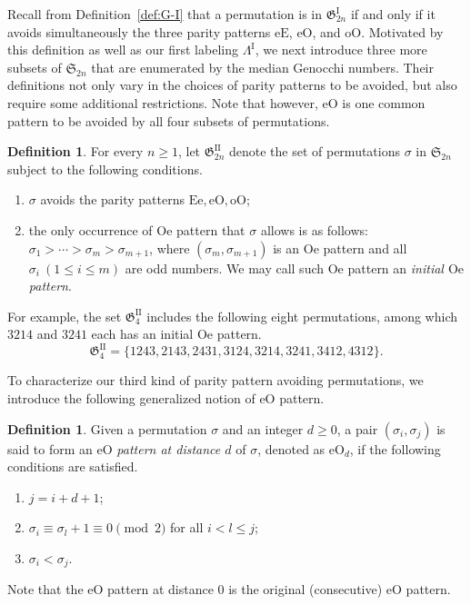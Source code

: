 \documentclass[11pt,reqno]{amsart}
\numberwithin{equation}{section}
\theoremstyle{plain}
\theoremstyle{definition}
\newtheorem{Def}[theorem]{Definition}
\renewcommand{\S}{\mathfrak{S}}
\newcommand{\fG}{\mathfrak{G}}
\newcommand{\GI}{\fG^{\mathrm{I}}}
\newcommand{\GII}{\fG^{\mathrm{II}}}
\newcommand{\LI}{\Lambda^{\mathrm{I}}}
\def\oO{\mathrm{oO}}
\def\eE{\mathrm{eE}}
\def\eO{\mathrm{eO}}
\def\Ee{\mathrm{Ee}}
\def\Oe{\mathrm{Oe}}
\begin{document}
Recall from Definition~\ref{def:G-I} that a permutation is in $\GI_{2n}$ if and only if it avoids simultaneously the three parity patterns $\eE$, $\eO$, and $\oO$. Motivated by this definition as well as our first labeling $\LI$, we next introduce three more subsets of $\S_{2n}$ that are enumerated by the median Genocchi numbers. Their definitions not only vary in the choices of parity patterns to be avoided, but also require some additional restrictions. Note that however, $\eO$ is one common pattern to be avoided by all four subsets of permutations.






	




\begin{Def}\label{def:GII}
	For every $n\geq 1$, let $\GII_{2n}$ denote the set of permutations $\sigma$ in $\S_{2n}$ subject to the following conditions. 
	\begin{enumerate}
		\item $\sigma$ avoids the parity patterns $\Ee,\eO,\oO$;
		\item the only occurrence of $\Oe$ pattern that $\sigma$ allows is as follows: $\sigma_1>\cdots>\sigma_m>\sigma_{m+1}$, where $(\sigma_m,\sigma_{m+1})$ is an $\Oe$ pattern and all $\sigma_i~(1 \le i \le m)$ are odd numbers. We may call such $\Oe$ pattern an {\it initial $\Oe$ pattern}.
	\end{enumerate}  
\end{Def}

For example, the set $\GII_{4}$ includes the following eight permutations, among which $3214$ and $3241$ each has an initial $\Oe$ pattern. 
$$\GII_{4}=\{1243,2143,2431,3124,3214,3241,3412,4312\}.$$

To characterize our third kind of parity pattern avoiding permutations, we introduce the following generalized notion of $\eO$ pattern. 



\begin{Def}\label{def:gen eO}
	Given a permutation $\sigma$ and an integer $d\ge 0$, a pair $(\sigma_i,\sigma_j)$ is said to form an $\eO$ \emph{pattern at distance $d$} of $\sigma$, denoted as $\eO_d$, if the following conditions are satisfied.
	\begin{enumerate}
		\item $j=i+d+1$;
		\item $\sigma_i\equiv \sigma_l+1\equiv 0 \pmod 2$ for all $i<l\le j$;
		\item $\sigma_i<\sigma_j$.
	\end{enumerate}
\end{Def}
Note that the $\eO$ pattern at distance $0$ is the original (consecutive) $\eO$ pattern.
\end{document}
